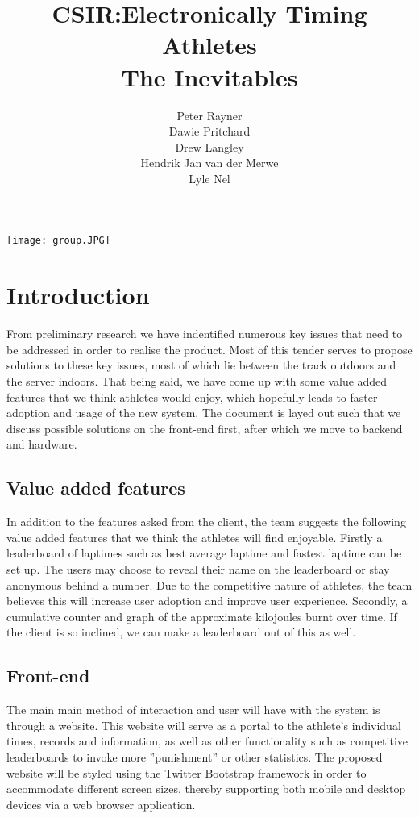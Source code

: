 \documentclass{article}
\title{CSIR:Electronically Timing Athletes\\
The Inevitables
}
\author{  
            Peter Rayner\\
            Dawie Pritchard\\
            Drew Langley\\
            Hendrik Jan van der Merwe\\
            Lyle Nel\\
        }
\begin{document}
\maketitle

\texttt{[image: group.JPG]}

\newpage

\tableofcontents

\newpage


\section{Introduction}
From preliminary research we have indentified numerous key issues that need to be addressed in order to realise the product. Most of this tender serves to propose solutions to these key issues, most of which lie between the track outdoors and the server indoors. That being said, we have come up with some value added features that we think athletes would enjoy, which hopefully leads to faster adoption and usage of the new system. The document is layed out such that we discuss possible solutions on the front-end first, after which we move to backend and hardware.


\subsection{Value added features}
In addition to the features asked from the client, the team suggests the following value added features that we think the athletes will find enjoyable. Firstly a leaderboard of laptimes such as best average laptime and fastest laptime can be set up. The users may choose to reveal their name on the leaderboard or stay anonymous behind a number. Due to the competitive nature of athletes, the team believes this will increase user adoption and improve user experience. Secondly, a cumulative counter and graph of the approximate kilojoules burnt over time. If the client is so inclined, we can make a leaderboard out of this as well.

\subsection{Front-end}
The main main method of interaction and user will have with the system is through a website. This website will serve as a portal to the athlete's individual times, records and information, as well as other functionality such as competitive leaderboards to invoke more ''punishment'' or other statistics. The proposed website will be styled using the Twitter Bootstrap framework in order to accommodate different screen sizes, thereby supporting both mobile and desktop devices via a web browser application.
\end{document}
